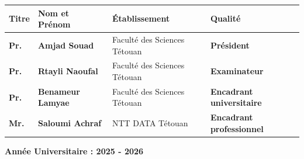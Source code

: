 \documentclass[12pt, a4paper, openany]{report}
\begin{document}
\begin{titlepage}
\noindent
\begin{tabular}{|l|l|l|l|}
  \hline
  \rowcolor{primaryBlue}
  \textbf{\color{white}Titre} &
  \textbf{\color{white}Nom et Prénom} &
  \textbf{\color{white}Établissement} &
  \textbf{\color{white}Qualité} \\
  \hline
  \rowcolor{lightBlue}
  \textbf{\color{primaryBlue}Pr.} &
  \textbf{\color{primaryBlue}Amjad Souad} &
  {\color{primaryBlue}\small Faculté des Sciences Tétouan} &
  {\color{primaryBlue}\bfseries Président} \\
  \hline
  \textbf{\color{primaryBlue}Pr.} &
  \textbf{\color{primaryBlue}Rtayli Naoufal} &
  {\color{primaryBlue}\small Faculté des Sciences Tétouan} &
  {\color{primaryBlue}\bfseries Examinateur} \\
  \hline
  \rowcolor{lightBlue}
  \textbf{\color{primaryBlue}Pr.} &
  \textbf{\color{primaryBlue}Benameur Lamyae} &
  {\color{primaryBlue}\small Faculté des Sciences Tétouan} &
  {\color{primaryBlue}\bfseries Encadrant universitaire} \\
  \hline
  \textbf{\color{primaryBlue}Mr.} &
  \textbf{\color{primaryBlue}Saloumi Achraf} &
  {\color{primaryBlue}\small NTT DATA Tétouan} &
  {\color{primaryBlue}\bfseries Encadrant professionnel} \\
  \hline
\end{tabular}

\vspace{0.2cm}

\begin{center}
  {\fontsize{14}{16}\selectfont\color{royalBlue}\bfseries Année Universitaire : 2025 - 2026\par}
\end{center}

\vspace{0.0cm}


\end{titlepage}

\setcounter{page}{2}
\end{document}
